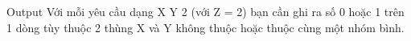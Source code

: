 Output  
Với mỗi yêu cầu dạng X Y 2 (với Z = 2) bạn cần ghi ra số 0 hoặc 1 trên 1 dòng tùy thuộc 2 thùng X và Y không thuộc hoặc thuộc cùng một nhóm bình.